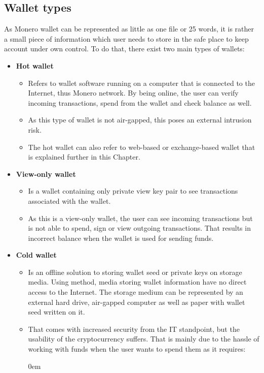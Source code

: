 \documentclass[
  printed, %
  table,   %
  lof,     %
  lot,     %
           oneside, color
]{fithesis3}
\begin{document}
\subsection{Wallet types}
\label{sec:wallettypes}
As Monero wallet can be represented as little as one file or 25 words, it is rather a small piece of information which user needs to store in the safe place to keep account under own control. To do that, there exist two main types of wallets:
\begin{itemize}\itemsep0em
\item \textbf{Hot wallet}
\begin{itemize}\itemsep0em
\item Refers to wallet software running on a computer that is connected to the Internet, thus Monero network. By being online, the user can verify incoming transactions, spend from the wallet and check balance as well.
\item As this type of wallet is not air-gapped, this poses an external intrusion risk.
\item The hot wallet can also refer to web-based or exchange-based wallet that is explained further in this Chapter.
\end{itemize}
\item \textbf{View-only wallet}
\begin{itemize}\itemsep0em
\item Is a wallet containing only private view key pair to see transactions associated with the wallet.
\item As this is a view-only wallet, the user can see incoming transactions but is not able to spend, sign or view outgoing transactions. That results in incorrect balance when the wallet is used for sending funds.
\end{itemize}
\item \textbf{Cold wallet}
\begin{itemize}\itemsep0em
\item Is an offline solution to storing wallet seed or private keys on storage media. Using method, media storing wallet information have no direct access to the Internet. The storage medium can be represented by an external hard drive, air-gapped computer as well as paper with wallet seed written on it.
\item That comes with increased security from the IT standpoint, but the usability of the cryptocurrency suffers. That is mainly due to the hassle of working with funds when the user wants to spend them as it requires:
\begin{itemize}\itemsep0em

\end{itemize}
\end{itemize}
\end{itemize}
\end{document}
